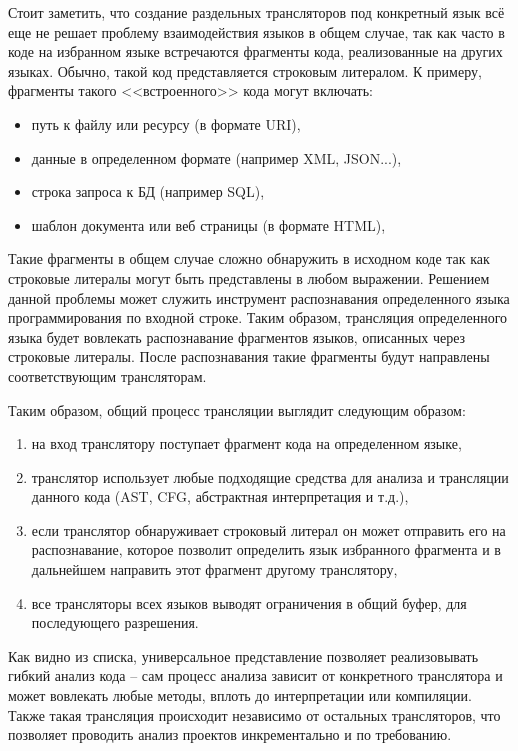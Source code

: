 Стоит заметить, что создание раздельных трансляторов под конкретный язык всё еще не решает проблему
взаимодействия языков в общем случае, так как часто в коде на избранном языке встречаются фрагменты
кода, реализованные на других языках. Обычно, такой код представляется строковым литералом. К примеру,
фрагменты такого <<встроенного>> кода могут включать:
\begin{itemize}
    \item путь к файлу или ресурсу (в формате URI),
    \item данные в определенном формате (например XML, JSON...),
    \item строка запроса к БД (например SQL),
    \item шаблон документа или веб страницы (в формате HTML),
\end{itemize}

Такие фрагменты в общем случае сложно обнаружить в исходном коде так как строковые литералы
могут быть представлены в любом выражении. Решением данной проблемы может служить инструмент
распознавания определенного языка программирования по входной строке. Таким образом,
трансляция определенного языка будет вовлекать распознавание фрагментов языков, описанных через строковые литералы.
После распознавания такие фрагменты будут направлены соответствующим трансляторам.

Таким образом, общий процесс трансляции выглядит следующим образом:
\begin{enumerate}[1)]
    \item на вход транслятору поступает фрагмент кода на определенном языке,
    \item транслятор использует любые подходящие средства для анализа и трансляции данного кода
    (AST, CFG, абстрактная интерпретация и т.д.),
    \item если транслятор обнаруживает строковый литерал он может отправить его на распознавание, которое
    позволит определить язык избранного фрагмента и в дальнейшем направить этот фрагмент другому транслятору,
    \item все трансляторы всех языков выводят ограничения в общий буфер, для последующего разрешения.
\end{enumerate}

Как видно из списка, универсальное представление позволяет реализовывать гибкий анализ кода --
сам процесс анализа зависит от конкретного транслятора и может вовлекать любые методы, вплоть до интерпретации
или компиляции. Также такая трансляция происходит независимо от остальных трансляторов, что
позволяет проводить анализ проектов инкрементально и по требованию.

